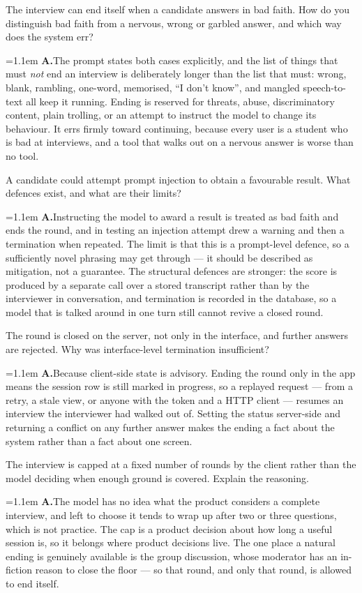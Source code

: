 \documentclass[11pt,a4paper]{article}
\newcommand{\ans}[1]{%
  \par\vspace{0.32em}%
  \begingroup
  \small\color{answerink}%
  \leftskip=1.1em
  \noindent\textbf{\color{accent}A.}\hspace{0.45em}#1\par
  \endgroup
  \vspace{0.1em}%
}
\begin{document}
\begin{questions}[resume]
\item The interview can end itself when a candidate answers in bad faith. How do
you distinguish bad faith from a nervous, wrong or garbled answer, and which way
does the system err?
\ans{The prompt states both cases explicitly, and the list of things that must
\emph{not} end an interview is deliberately longer than the list that must:
wrong, blank, rambling, one-word, memorised, ``I don't know'', and mangled
speech-to-text all keep it running. Ending is reserved for threats, abuse,
discriminatory content, plain trolling, or an attempt to instruct the model to
change its behaviour. It errs firmly toward continuing, because every user is a
student who is bad at interviews, and a tool that walks out on a nervous answer is
worse than no tool.}

\item A candidate could attempt prompt injection to obtain a favourable result.
What defences exist, and what are their limits?
\ans{Instructing the model to award a result is treated as bad faith and ends the
round, and in testing an injection attempt drew a warning and then a termination
when repeated. The limit is that this is a prompt-level defence, so a sufficiently
novel phrasing may get through --- it should be described as mitigation, not a
guarantee. The structural defences are stronger: the score is produced by a
separate call over a stored transcript rather than by the interviewer in
conversation, and termination is recorded in the database, so a model that is
talked around in one turn still cannot revive a closed round.}

\item The round is closed on the server, not only in the interface, and further
answers are rejected. Why was interface-level termination insufficient?
\ans{Because client-side state is advisory. Ending the round only in the app means
the session row is still marked in progress, so a replayed request --- from a
retry, a stale view, or anyone with the token and a HTTP client --- resumes an
interview the interviewer had walked out of. Setting the status server-side and
returning a conflict on any further answer makes the ending a fact about the
system rather than a fact about one screen.}

\item The interview is capped at a fixed number of rounds by the client rather
than the model deciding when enough ground is covered. Explain the reasoning.
\ans{The model has no idea what the product considers a complete interview, and
left to choose it tends to wrap up after two or three questions, which is not
practice. The cap is a product decision about how long a useful session is, so it
belongs where product decisions live. The one place a natural ending is genuinely
available is the group discussion, whose moderator has an in-fiction reason to
close the floor --- so that round, and only that round, is allowed to end itself.}


\end{questions}
\end{document}
